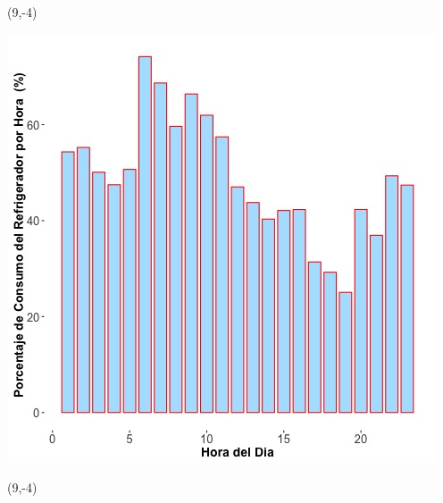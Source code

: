 \documentclass{article}\usepackage[]{graphicx}\usepackage[]{color}
\newenvironment{knitrout}{}{} %
\begin{document}
 \begin{textblock}{1}(9,-4)
\begin{minipage}{20em}
\begingroup

\endgroup
\end{minipage}
\end{textblock}

 \vspace{2cm}

\begin{knitrout}
\color{fgcolor}
\includegraphics[scale=0.65]{figure/A9_fridge_energy_pct.jpg} 
\end{knitrout}

 \begin{textblock}{1}(9,-4)
\begin{minipage}{20em}
\begingroup

\endgroup
\end{minipage}
\end{textblock}

\vspace{20cm}
 
\end{document}
